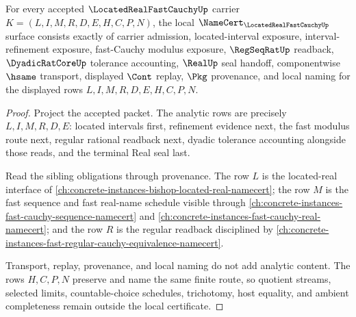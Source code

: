 \begin{theorem}
\label{thm:located-real-fast-cauchy-namecert-obligations}
For every accepted $\LocatedRealFastCauchyUp$ carrier $K=(L,I,M,R,D,E,H,C,P,N)$, the local $\NameCert_{\LocatedRealFastCauchyUp}$ surface consists exactly of carrier admission, located-interval exposure, interval-refinement exposure, fast-Cauchy modulus exposure, $\RegSeqRatUp$ readback, $\DyadicRatCoreUp$ tolerance accounting, $\RealUp$ seal handoff, componentwise $\hsame$ transport, displayed $\Cont$ replay, $\Pkg$ provenance, and local naming for the displayed rows $L,I,M,R,D,E,H,C,P,N$.
\end{theorem}
\begin{proof}
Project the accepted packet. The analytic rows are precisely $L,I,M,R,D,E$: located intervals first, refinement evidence next, the fast modulus route next, regular rational readback next, dyadic tolerance accounting alongside those reads, and the terminal Real seal last.

Read the sibling obligations through provenance. The row $L$ is the located-real interface of \autoref{ch:concrete-instances-bishop-located-real-namecert}; the row $M$ is the fast sequence and fast real-name schedule visible through \autoref{ch:concrete-instances-fast-cauchy-sequence-namecert} and \autoref{ch:concrete-instances-fast-cauchy-real-namecert}; and the row $R$ is the regular readback disciplined by \autoref{ch:concrete-instances-fast-regular-cauchy-equivalence-namecert}.

Transport, replay, provenance, and local naming do not add analytic content. The rows $H,C,P,N$ preserve and name the same finite route, so quotient streams, selected limits, countable-choice schedules, trichotomy, host equality, and ambient completeness remain outside the local certificate.
\end{proof}

